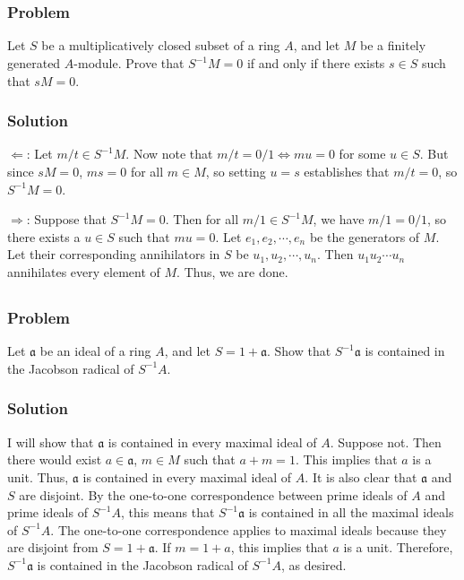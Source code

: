 \documentclass[book,12pt,oneside,openany]{memoir}
\begin{document}
\chapter{}

\section{}
\subsection{Problem}
Let $S$ be a multiplicatively closed subset of a ring $A$, and let $M$ be a finitely generated $A$-module. Prove that $S^{-1}M = 0$ if and only if there exists $s \in S$ such that $sM = 0$.

\subsection{Solution}
$\Leftarrow$: Let $m/t \in S^{-1}M$. Now note that $m/t  = 0/1 \Leftrightarrow mu = 0$ for some $u \in S$. But since $sM = 0$, $ms = 0$ for all $m \in M$, so setting $u = s$ establishes that $m/t = 0$, so $S^{-1}M = 0$.

$\Rightarrow$: Suppose that $S^{-1}M = 0$. Then for all $m/1 \in S^{-1}M$, we have $m/1 = 0/1$, so there exists a $u \in S$ such that $mu = 0$. Let $e_1, e_2, \cdots, e_n$ be the generators of $M$. Let their corresponding annihilators in $S$ be $u_1, u_2, \cdots, u_n$. Then $u_1 u_2 \cdots u_n$ annihilates every element of $M$. Thus, we are done.

\section{}
\subsection{Problem}
Let $\mathfrak{a}$ be an ideal of a ring $A$, and let $S = 1 + \mathfrak{a}$. Show that $S^{-1}\mathfrak{a}$ is contained in the Jacobson radical of $S^{-1}A$. 

\subsection{Solution}
I will show that $\mathfrak{a}$ is contained in every maximal ideal of $A$. Suppose not. Then there would exist $a \in \mathfrak{a}$, $m \in M$ such that $a + m = 1$. This implies that $a$ is a unit. Thus, $\mathfrak{a}$ is contained in every maximal ideal of $A$. It is also clear that $\mathfrak{a}$ and $S$ are disjoint. By the one-to-one correspondence between prime ideals of $A$ and prime ideals of $S^{-1}A$, this means that $S^{-1}\mathfrak{a}$ is contained in all the maximal ideals of $S^{-1}A$. The one-to-one correspondence applies to maximal ideals because they are disjoint from $S = 1 + \mathfrak{a}$. If $m = 1 + a$, this implies that $a$ is a unit. Therefore, $S^{-1}\mathfrak{a}$ is contained in the Jacobson radical of $S^{-1}A$, as desired.
\end{document}
